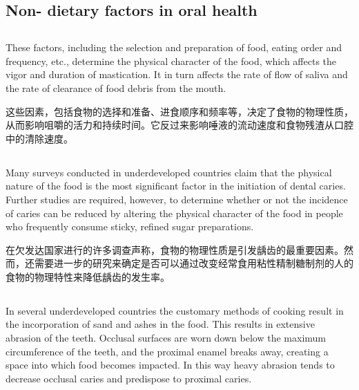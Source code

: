 \documentclass[]{article}
\begin{document}
\subsection*{Non- dietary factors in oral health}
\subsection{}
\begin{spacing}{2.0}
	{\Large These factors, including the selection and preparation of food, eating order and frequency, etc., determine the physical character of the food, which affects the vigor and duration of mastication. It in turn affects the rate of flow of saliva and the rate of clearance of food debris from the mouth.}\newline
\end{spacing}

这些因素，包括食物的选择和准备、进食顺序和频率等，决定了食物的物理性质，从而影响咀嚼的活力和持续时间。它反过来影响唾液的流动速度和食物残渣从口腔中的清除速度。

\subsection{}
\begin{spacing}{2.0}
	{\Large Many surveys conducted in underdeveloped countries claim that the physical nature of the food is the most significant factor in the initiation of dental caries. Further studies are required, however, to determine whether or not the incidence of caries can	be reduced by altering the physical character of the food in people who frequently consume sticky, refined sugar preparations.}\newline
\end{spacing}

在欠发达国家进行的许多调查声称，食物的物理性质是引发龋齿的最重要因素。然而，还需要进一步的研究来确定是否可以通过改变经常食用粘性精制糖制剂的人的食物的物理特性来降低龋齿的发生率。

\subsection{}
\begin{spacing}{2.0}
	{\Large In several underdeveloped countries the customary methods of cooking result in the incorporation of sand and ashes in the food. This results in extensive abrasion of the teeth. Occlusal surfaces are worn down below the maximum circumference of the teeth, and the proximal enamel breaks away, creating a space into which food becomes impacted. In this way heavy abrasion tends to decrease occlusal caries and predispose to proximal caries.}\newline
\end{spacing}
\end{document}
